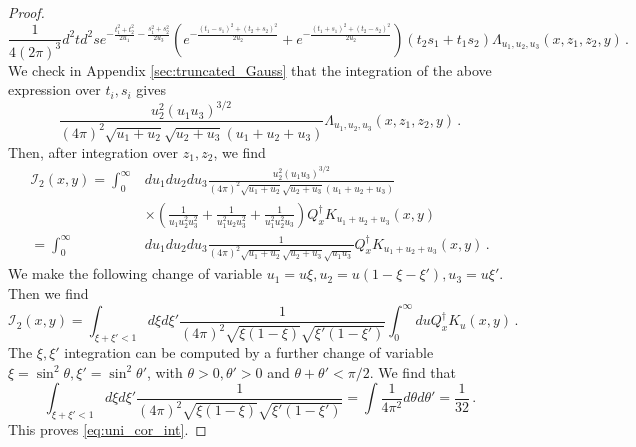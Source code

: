 \documentclass[11pt]{article}
\numberwithin{equation}{section}
\begin{document}
\begin{proof}
\begin{equation}
			\frac{1}{4(2\pi)^3}d^2td^2se^{ -\frac{t_1^2+ t_2^2}{2 u_1} - \frac{s_1^2+ s_2^2}{2 u_3}}(e^{- \frac{(t_1 - s_1)^2 + (t_2 + s_2)^2}{2 u_2}} + e^{- \frac{(t_1 + s_1)^2 + (t_2 - s_2)^2}{2 u_2}}) (t_2s_1 + t_1s_2)\Lambda_{u_1,u_2,u_3}(x,z_1,z_2,y)\,.
	\end{equation}
	We check in Appendix \ref{sec:truncated_Gauss} that the integration of the above expression over $t_i,s_i$ gives
	\begin{equation}
		\frac{u_2^{2} (u_1u_3)^{3/2}}{(4\pi)^2\sqrt{u_1+u_2} \sqrt{u_2+u_3} (u_1+u_2+u_3)}\Lambda_{u_1,u_2,u_3}(x,z_1,z_2,y)\,.
	\end{equation}
	Then, after integration over $z_1,z_2$, we find  
		\begin{equation}
\begin{aligned}
			\mathcal{I}_2(x,y) = \int_{0}^{\infty}&du_1du_2du_3\frac{ u_2^{2} (u_1u_3)^{3/2}}{(4\pi)^2\sqrt{u_1+u_2} \sqrt{u_2+u_3} (u_1+u_2+u_3)}\\
			&\times \left(\frac{1}{u_1u_2^2u_3^2} + \frac{1}{u_1^2u_2u_3^2} + \frac{1}{u_1^2u_2^2u_3}\right)Q^\dagger_xK_{u_1+u_2+u_3}(x,y)\\
			= \int_{0}^{\infty}&du_1du_2du_3\frac{1 }{(4\pi)^2\sqrt{u_1+u_2} \sqrt{u_2+u_3} \sqrt{u_1u_3}}Q^\dagger_xK_{u_1+u_2+u_3}(x,y)\,.
\end{aligned}
	\end{equation}
	We make the following change of variable $u_1 = u\xi,u_2 = u(1-\xi - \xi'), u_3 = u\xi'$. Then we find
	\begin{equation}
			\mathcal{I}_2(x,y) = \int_{\xi+\xi' < 1}d\xi d\xi' \frac{1 }{(4\pi)^2\sqrt{\xi(1-\xi)} \sqrt{\xi'(1-\xi')}}\int_{0}^{\infty}du Q^\dagger_xK_{u}(x,y)\,.
	\end{equation}
The $\xi,\xi'$ integration can be computed by a further change of variable $\xi = \sin^2\theta,\xi' = \sin^2\theta'$, with $\theta>0,\theta'>0$ and $\theta+\theta' < \pi/2$. We find that
\begin{equation}
	\int_{\xi+\xi' < 1}d\xi d\xi' \frac{1 }{(4\pi)^2\sqrt{\xi(1-\xi)} \sqrt{\xi'(1-\xi')}} = \int \frac{1}{4\pi^2}d\theta d\theta'  = \frac{1}{32}\,.
\end{equation}	
This proves \eqref{eq:uni_cor_int}.
\end{proof}
\end{document}
